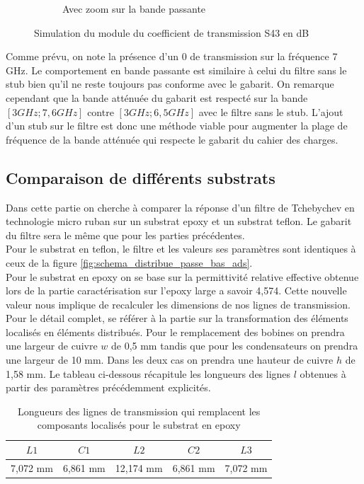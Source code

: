 \documentclass[french]{article}
\begin{document}
\begin{figure}[H]
\begin{subfigure}[b]{0.49\textwidth}
		\caption{Avec zoom sur la bande passante}
		\label{fig:simu_zoom_passe_bas_distribue_ameliore}
	\end{subfigure}
	\caption{Simulation du module du coefficient de transmission S43 en dB}
	\label{fig:simu_passe_bas_distribue_ameliore}
\end{figure}


Comme prévu, on note la présence d'un 0 de transmission sur la fréquence 7 GHz. Le comportement en bande passante est similaire à celui du filtre sans le stub bien qu'il ne reste toujours pas conforme avec le gabarit. On remarque cependant que la bande atténuée du gabarit est respecté sur la bande $[3 GHz; 7,6 GHz]$ contre $[3GHz; 6,5 GHz]$ avec le filtre sans le stub. L'ajout d'un stub sur le filtre est donc une méthode viable pour augmenter la plage de fréquence de la bande atténuée qui respecte le gabarit du cahier des charges.



\subsection{Comparaison de différents substrats}

Dans cette partie on cherche à comparer la réponse d'un filtre de Tchebychev en technologie micro ruban sur un substrat epoxy et un substrat teflon. Le gabarit du filtre sera le même que pour les parties précédentes.\\

Pour le substrat en teflon, le filtre et les valeurs ses paramètres sont identiques à ceux de la figure \ref{fig:schema_distribue_passe_bas_ads}.\\

Pour le substrat en epoxy on se base sur la permittivité relative effective obtenue lors de la partie caractérisation sur l'epoxy large a savoir 4,574. Cette nouvelle valeur nous implique de recalculer les dimensions de nos lignes de transmission. Pour le détail complet, se référer à la partie sur la transformation des éléments localisés en éléments distribués. Pour le remplacement des bobines on prendra une largeur de cuivre $w$ de 0,5 mm tandis que pour les condensateurs on prendra une largeur de 10 mm. Dans les deux cas on prendra une hauteur de cuivre $h$ de 1,58 mm. Le tableau ci-dessous récapitule les longueurs des lignes $l$ obtenues à partir des paramètres précédemment explicités.

\begin{table}[H]
	\centering
	\begin{tabular}{|c|c|c|c|c|}
		\hline
		$L1$ & $C1$ & $L2$ & $C2$ & $L3$  \\
		\hline
		7,072 mm & 6,861 mm & 12,174 mm & 6,861 mm & 7,072 mm \\
		\hline
	\end{tabular}
	\caption{Longueurs des lignes de transmission qui remplacent les composants localisés pour le substrat en epoxy}
	\label{tab:longueur_ligne_passe_bas_tche_epoxy}
\end{table}
\end{document}
